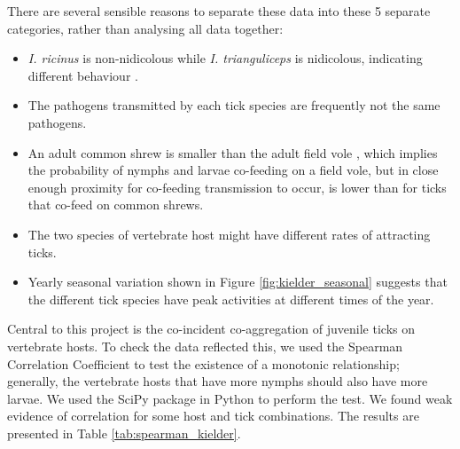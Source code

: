 \documentclass[hidelinks]{article}
\begin{document}
There are several sensible reasons to separate these data into these 5 separate categories, rather than analysing all data together:

\begin{itemize}
    \item \textit{I. ricinus} is non-nidicolous while \textit{I. trianguliceps} is nidicolous, indicating different behaviour \citep{Nicholson2019}.
    \item The pathogens transmitted by each tick species are frequently not the same pathogens.
    \item An adult common shrew is smaller than the adult field vole \citep{mammalSociety_FV, mammalSociety_SA}, which implies the probability of nymphs and larvae co-feeding on a field vole, but in close enough proximity for co-feeding transmission to occur, is lower than for ticks that co-feed on common shrews. 
    \item The two species of vertebrate host might have different rates of attracting ticks.
    \item Yearly seasonal variation shown in Figure \ref{fig:kielder_seasonal} suggests that the different tick species have peak activities at different times of the year.
\end{itemize}

Central to this project is the co-incident co-aggregation of juvenile ticks on vertebrate hosts. To check the data reflected this, we used the Spearman Correlation Coefficient to test the existence of a monotonic relationship; generally, the vertebrate hosts that have more nymphs should also have more larvae. 
We used the SciPy package in Python to perform the test. We found weak evidence of correlation for some host and tick combinations. The results are presented in Table \ref{tab:spearman_kielder}.
\end{document}

